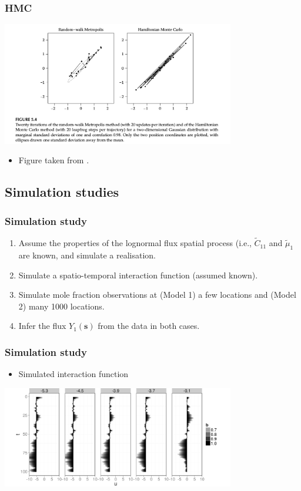 \documentclass{beamer}
\newcommand{\svec} {\textbf{s}}
\begin{document}
\begin{frame}
\frametitle{HMC}

\begin{center}
\includegraphics[width=4in]{HMC2.png}
\end{center}
\begin{itemize}
\item Figure taken from \cite{Neal_2011}.
\end{itemize}
\end{frame}


\subsection{Simulation studies}


\begin{frame}
\frametitle{Simulation study}

\begin{enumerate}
\item Assume the properties of the lognormal flux spatial process (i.e., $\widetilde{C}_{11}$ and $\widetilde{\mu}_{1}$ are known, and simulate a realisation. \vfill
\item Simulate a spatio-temporal interaction function (assumed known).\vfill
\item Simulate mole fraction observations at (Model 1) a few locations and (Model 2) many 1000 locations.\vfill
\item Infer the flux $Y_1(\svec)$ from the data in both cases.\vfill
\end{enumerate}
\end{frame}

\begin{frame}
\frametitle{Simulation study}

\begin{itemize}
\item Simulated interaction function
\end{itemize}

\begin{center}
\includegraphics[width=4in]{B_plot.png}
\end{center}
\end{frame}
\end{document}
